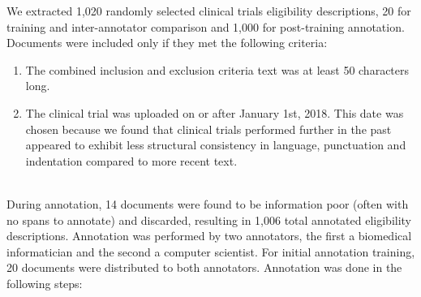 \documentclass[fleqn,10pt]{wlscirep}
\begin{document}
\noindent We extracted 1,020 randomly selected clinical trials eligibility descriptions, 20 for training and inter-annotator comparison and 1,000 for post-training annotation. Documents were included only if they met the following criteria:
\begin{enumerate}
    \item The combined inclusion and exclusion criteria text was at least 50 characters long.
    \item The clinical trial was uploaded on or after January 1st, 2018. This date was chosen because we found that clinical trials performed further in the past appeared to exhibit less structural consistency in language, punctuation and indentation compared to more recent text.
\end{enumerate}
\\ 
\noindent During annotation, 14 documents were found to be information poor (often with no spans to annotate) and discarded, resulting in 1,006 total annotated eligibility descriptions. Annotation was performed by two annotators, the first a biomedical informatician and the second a computer scientist. For initial annotation training, 20 documents were distributed to both annotators. Annotation was done in the following steps:
\end{document}
